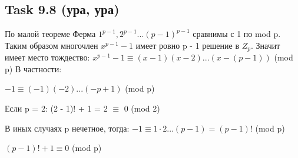 \documentclass{article}
\begin{document}
        \subsection*{\huge Task 9.8 (ура, ура)}
        {\Large
            По малой теореме Ферма $1^{p-1}, 2^{p-1}...(p-1)^{p-1}$ сравнимы с 1 по mod p. Таким образом многочлен $x^{p-1} - 1$ имеет ровно p - 1 решение в $Z_p$. Значит имеет место тождество:
            $x^{p-1} -1 \equiv (x-1)(x-2)...(x - (p-1))$ (mod p)
            В частности:\par
            $-1 \equiv (-1)(-2)...(-p+1)$ (mod p)\par
            Если p = 2: (2 - 1)!  + 1 = 2 $\equiv$ 0 (mod 2)\par
            В иных случаях p нечетное, тогда:
            $-1 \equiv 1\cdot2 ... (p-1) = (p-1)!$ (mod p)\par
            $(p-1)! + 1 \equiv 0$ (mod p)
        }
\end{document}
